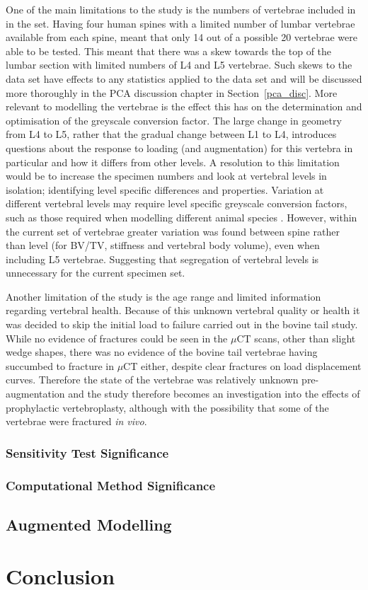 One of the main limitations to the study is the numbers of vertebrae included in in the set.
Having four human spines with a limited number of lumbar vertebrae available from each spine, meant that only 14 out of a possible 20 vertebrae were able to be tested.
This meant that there was a skew towards the top of the lumbar section with limited numbers of L4 and L5 vertebrae.
Such skews to the data set have effects to any statistics applied to the data set and will be discussed more thoroughly in the PCA discussion chapter in Section~\ref{pca_disc}.
More relevant to modelling the vertebrae is the effect this has on the determination and optimisation of the greyscale conversion factor.
The large change in geometry from L4 to L5, rather that the gradual change between L1 to L4, introduces questions about the response to loading (and augmentation) for this vertebra in particular and how it differs from other levels.
A resolution to this limitation would be to increase the specimen numbers and look at vertebral levels in isolation; identifying level specific differences and properties.
Variation at different vertebral levels may require level specific greyscale conversion factors, such as those required when modelling different animal species \cite{zapata2017methodology}.
However, within the current set of vertebrae greater variation was found between spine rather than level (for BV/TV, stiffness and vertebral body volume), even when including L5 vertebrae.
Suggesting that segregation of vertebral levels is unnecessary for the current specimen set. 

Another limitation of the study is the age range and limited information regarding vertebral health.
Because of this unknown vertebral quality or health it was decided to skip the initial load to failure carried out in the bovine tail study.
While no evidence of fractures could be seen in the $\mu$CT scans, other than slight wedge shapes, there was no evidence of the bovine tail vertebrae having succumbed to fracture in $\mu$CT either, despite clear fractures on load displacement curves.
Therefore the state of the vertebrae was relatively unknown pre-augmentation and the study therefore becomes an investigation into the effects of prophylactic vertebroplasty, although with the possibility that some of the vertebrae were fractured \textit{in vivo}.



\subsubsection{Sensitivity Test Significance}

\subsubsection{Computational Method Significance}

\subsection{Augmented Modelling}


\section{Conclusion}







